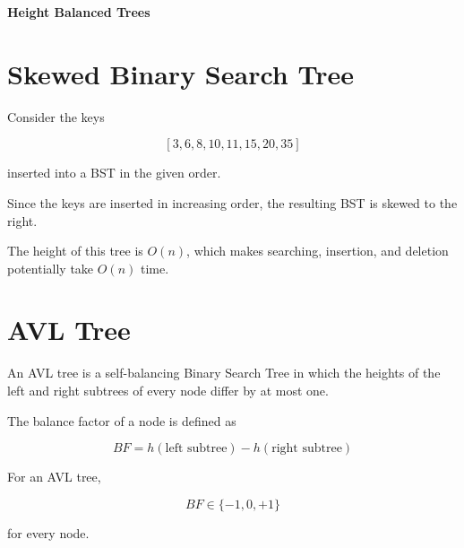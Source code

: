 \documentclass[12pt,a4paper]{article}
\begin{document}
\begin{center}
    {\LARGE\textbf{Height Balanced Trees}}
\end{center}

\vspace{0.5cm}

\section{Skewed Binary Search Tree}



Consider the keys

\[
[3,6,8,10,11,15,20,35]
\]

inserted into a BST in the given order.

Since the keys are inserted in increasing order, the resulting BST is skewed to the right.

\begin{center}
\end{center}

The height of this tree is $O(n)$, which makes searching, insertion, and deletion potentially take $O(n)$ time.

\section{AVL Tree}

An AVL tree is a self-balancing Binary Search Tree in which the heights of the left and right subtrees of every node differ by at most one.

The balance factor of a node is defined as

\[
BF = h(\text{left subtree}) - h(\text{right subtree})
\]

For an AVL tree,

\[
BF \in \{-1,0,+1\}
\]

for every node.
\end{document}
